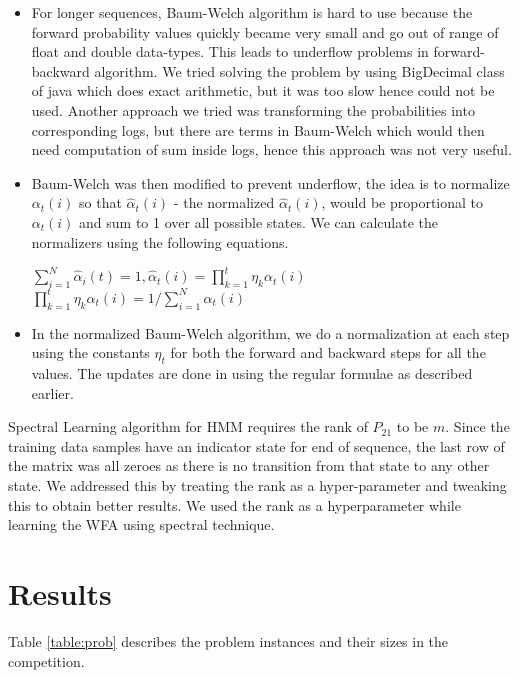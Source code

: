 \documentclass[letterpaper]{article}
\begin{document}
\begin{itemize}
	\item For longer sequences, Baum-Welch algorithm is hard to use because the forward probability values quickly became very small and go out of range of float and double data-types. This leads to underflow problems in forward-backward algorithm. We tried solving the problem by using BigDecimal class of java which does exact arithmetic, but it was too slow hence could not be used. Another approach we tried was transforming the probabilities into corresponding logs, but there are terms in Baum-Welch which would then need computation of sum inside logs, hence this approach was not very useful.   
	      	      	      	      	      
	\item Baum-Welch was then modified  to prevent underflow, the idea is to normalize $\alpha_t(i)$ so that $\hat{\alpha}_{t}(i)$ - the normalized $\hat{\alpha}_{t}(i)$, would be proportional to $\alpha_{t}(i)$ and sum to 1 over all possible states. We can calculate the normalizers using the following equations. 
	      	      	      	      	      
	      \begin{center}
	      	$\sum_{i=1}^{N}\hat{\alpha}_{i}(t) = 1 , \hat{\alpha}_{t}(i) = \prod_{k=1}^t\eta_{k}\alpha_{t}(i)$ 	      		      		      		      	
	      	$\prod_{k=1}^t\eta_{k}\alpha_{t}(i) = 1/\sum_{i=1}^N\alpha_{t}(i)$	      		      		      		      	
	      \end{center}	      	      
	      
	\item In the normalized Baum-Welch algorithm, we do a normalization at each step using the constants $\eta_{t}$ for both the forward and backward steps for all the values. The updates are done in using the regular formulae as described earlier.
	      
\end{itemize}

Spectral Learning algorithm for HMM requires the rank of $P_{21}$ to be $m$. Since the training data samples have an indicator state for end of sequence, the last row of the matrix was all zeroes as there is no transition from that state to any other state. We addressed this by treating the rank as a hyper-parameter and tweaking this to obtain better results. We used the rank as a hyperparameter while learning the WFA using spectral technique.

\section{Results}
Table \ref{table:prob} describes the problem instances and their sizes in the competition.
\end{document}

